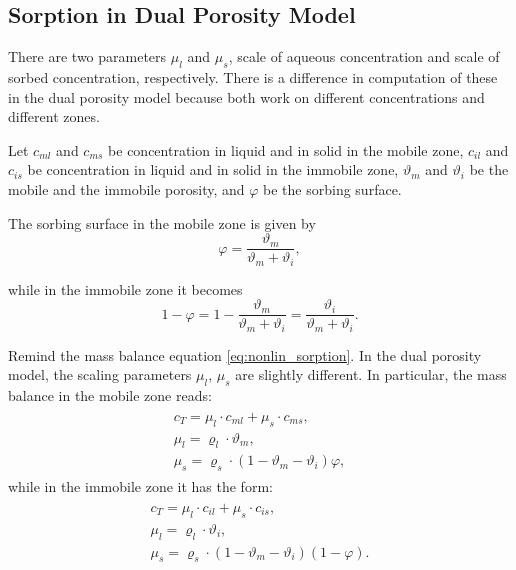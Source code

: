 \subsection{Sorption in Dual Porosity Model} 
\label{subsec:sorp_dual_por}
There are two parameters $\mu_l$ and $\mu_s$, scale of aqueous concentration and scale of sorbed concentration, respectively.  
There is a difference in computation of these in the dual porosity model because both work on different concentrations
and different zones.

Let $c_{ml}$ and $c_{ms}$ be concentration in liquid and in solid in the mobile zone, 
$c_{il}$ and $c_{is}$ be concentration in liquid and in solid in the immobile zone,
$\vartheta_m$ and $\vartheta_i$ be the mobile and the immobile porosity,
and $\varphi$ be the sorbing surface.

The sorbing surface in the mobile zone is given by
\begin{equation}
  \varphi = \frac{\vartheta_m}{\vartheta_m + \vartheta_i}, 
\end{equation}

while in the immobile zone it becomes
\[ 1 - \varphi = 1-\frac{\vartheta_m}{\vartheta_m + \vartheta_i} = \frac{\vartheta_i}{\vartheta_m + \vartheta_i}. \]

Remind the mass balance equation \eqref{eq:nonlin_sorption}.
In the dual porosity model, the scaling parameters $\mu_l$, $\mu_s$ are slightly different.
In particular, the mass balance in the mobile zone reads:
\begin{eqnarray}
 \begin{array}{l}
  c_T = \mu_l\cdot c_{ml} + \mu_s\cdot c_{ms},\\
  \mu_l = \varrho_l \cdot \vartheta_m, \\
  \mu_s = \varrho_s\cdot(1-\vartheta_m - \vartheta_i)\varphi,
 \end{array}
 \label{eq:scale_params_m}
\end{eqnarray}
while in the immobile zone it has the form:
\begin{eqnarray}
 \begin{array}{l}
  c_T = \mu_l\cdot c_{il} + \mu_s\cdot c_{is},\\
  \mu_l = \varrho_l \cdot \vartheta_i, \\
  \mu_s = \varrho_s\cdot(1-\vartheta_m - \vartheta_i)(1 - \varphi).
 \end{array}
 \label{eq:scale_params_i}
\end{eqnarray}
